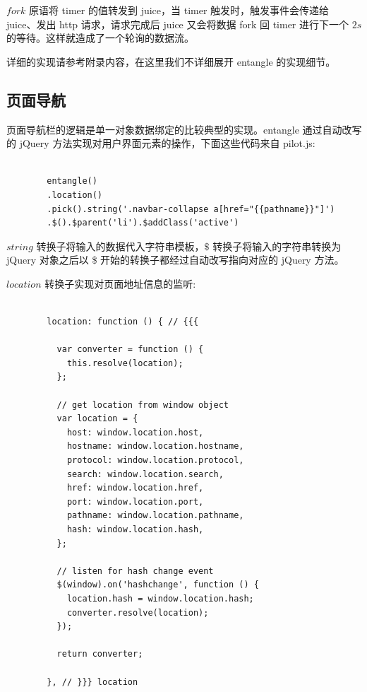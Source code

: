 $fork$ 原语将 timer 的值转发到 juice，当 timer 触发时，触发事件会传递给 juice、发出 http 请求，请求完成后 juice 又会将数据 fork 回 timer 进行下一个 $2s$ 的等待。这样就造成了一个轮询的数据流。

详细的实现请参考附录内容，在这里我们不详细展开 entangle 的实现细节。

\subsection{页面导航}

页面导航栏的逻辑是单一对象数据绑定的比较典型的实现。entangle 通过自动改写的 jQuery 方法实现对用户界面元素的操作，下面这些代码来自 pilot.js:

\begin{verbatim}

        entangle()
        .location()
        .pick().string('.navbar-collapse a[href="{{pathname}}"]')
        .$().$parent('li').$addClass('active')

\end{verbatim}

$string$ 转换子将输入的数据代入字符串模板，$\$$ 转换子将输入的字符串转换为 jQuery 对象之后以 \$ 开始的转换子都经过自动改写指向对应的 jQuery 方法。

$location$ 转换子实现对页面地址信息的监听:

\begin{verbatim}

        location: function () { // {{{

          var converter = function () {
            this.resolve(location);
          };

          // get location from window object
          var location = {
            host: window.location.host,
            hostname: window.location.hostname,
            protocol: window.location.protocol,
            search: window.location.search,
            href: window.location.href,
            port: window.location.port,
            pathname: window.location.pathname,
            hash: window.location.hash,
          };

          // listen for hash change event
          $(window).on('hashchange', function () {
            location.hash = window.location.hash;
            converter.resolve(location);
          });

          return converter;

        }, // }}} location

\end{verbatim}

